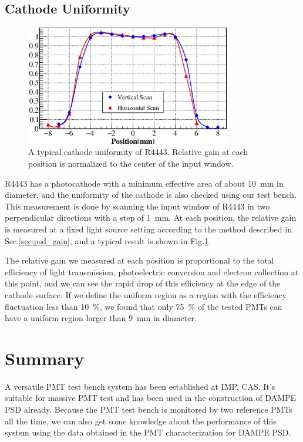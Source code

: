 \documentclass[review, times]{elsarticle}
\begin{document}
\subsection{Cathode Uniformity}
\label{sec:psd_cathodescan}

\begin{figure}
 \centering
 \includegraphics[width=90mm]{FIG12}
\caption{A typical cathode uniformity of R4443.
Relative gain at each position is normalized to the center of the input window.}
\label{fig:FIG12}
\end{figure} 

R4443 has a photocathode with a minimum effective area of about \SI{10}{\milli\meter} in diameter, and the uniformity of the cathode is also checked using our test bench.
This measurement is done by scanning the input window of R4443 in two perpendicular directions with a step of \SI{1}{\milli\meter}.
At each position, the relative gain is measured at a fixed light source setting according to the method described in Sec.\ref{sec:psd_gain}, and a typical result is shown in Fig.\ref{fig:FIG12}.

The relative gain we measured at each position is proportional to the total efficiency of light transmission, photoelectric conversion and electron collection at this point, and we can see the rapid drop of this efficiency at the edge of the cathode surface. 
If we define the uniform region as a region with the efficiency fluctuation less than \SI{10}{\percent}, we found that only \SI{75}{\percent} of the tested PMTs can have a uniform region larger than \SI{9}{\milli\meter} in diameter. 

\section{Summary}
\label{sec:summary}

A versatile PMT test bench system has been established at IMP, CAS. It's suitable for massive PMT test and has been used in the construction of DAMPE PSD already. Because the PMT test bench is monitored by two reference PMTs all the time, we can also get some knowledge about the performance of this system using the data obtained in the PMT characterization for DAMPE PSD.
\end{document}
